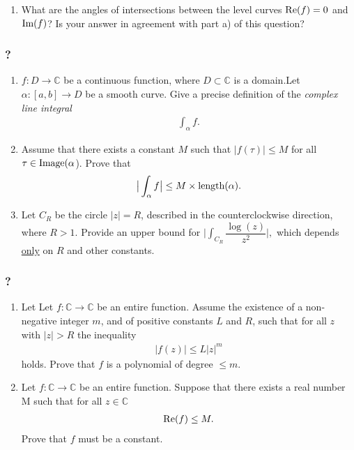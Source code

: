 \begin{enumerate}
\def\labelenumi{(\roman{enumi})}
\setcounter{enumi}{1}
\tightlist
\item
  What are the angles of intersections between the level curves
  \(\mbox{\textrm Re}{(f)}=0\) and \(\mbox{\textrm Im}{(f)}\)? Is your
  answer in agreement with part a) of this question?
\end{enumerate}

\hypertarget{section-193}{%
\subsubsection{?}\label{section-193}}

\begin{enumerate}
\def\labelenumi{(\alph{enumi})}
\item
  \(f: D\rightarrow {\mathbb C}\) be a continuous function, where
  \(D\subset {\mathbb C}\) is a domain.Let \(\alpha:[a,b]\rightarrow D\)
  be a smooth curve. Give a precise definition of the \emph{complex line
  integral}
  \begin{align*}\int_{\alpha} f.\end{align*}
\item
  Assume that there exists a constant \(M\) such that
  \(|f(\tau)|\leq M\) for all \(\tau\in \mbox{\textrm Image}(\alpha\)).
  Prove that
  \begin{align*}\big | \int_{\alpha} f \big |\leq M \times \mbox{\textrm length}(\alpha).\end{align*}
\item
  Let \(C_R\) be the circle \(|z|=R\), described in the counterclockwise
  direction, where \(R>1\). Provide an upper bound for
  \(\big | \int_{C_R} \dfrac{\log{(z)} }{z^2} \big |,\) which depends
  \underline{only} on \(R\) and other constants.
\end{enumerate}

\hypertarget{section-194}{%
\subsubsection{?}\label{section-194}}

\begin{enumerate}
\def\labelenumi{(\alph{enumi})}
\item
  Let Let \(f:{\mathbb C}\rightarrow {\mathbb C}\) be an entire
  function. Assume the existence of a non-negative integer \(m\), and of
  positive constants \(L\) and \(R\), such that for all \(z\) with
  \(|z|>R\) the inequality
  \begin{align*}|f(z)| \leq L |z|^m\end{align*}
  holds. Prove that \(f\) is a polynomial of degree \(\leq m\).
\item
  Let \(f:{\mathbb C}\rightarrow {\mathbb C}\) be an entire function.
  Suppose that there exists a real number M such that for all
  \(z\in {\mathbb C}\)
  \begin{align*}\mbox{\textrm Re} (f) \leq M.\end{align*}
  Prove that \(f\) must be a constant.
\end{enumerate}

